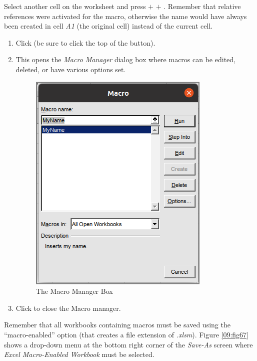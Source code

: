 Select another cell on the worksheet and press  $ + $  $ + $ . Remember that relative references were activated for the macro, otherwise the name would have always been created in cell \textit{A1} (the original cell) instead of the current cell.

\begin{enumbox}
	\begin{enumerate}
		\item Click  (be sure to click the top of the  button).
		\item This opens the \textit{Macro Manager} dialog box where macros can be edited, deleted, or have various options set.

		\begin{figure}[H]
			\centering
			\includegraphics[width=\maxwidth{.75\linewidth}]{gfx/ch09_fig66}
			\caption{The Macro Manager Box}
			\label{09:fig66}
		\end{figure}

		\item Click  to close the Macro manager.
	\end{enumerate}
\end{enumbox}

Remember that all workbooks containing macros must be saved using the ``macro-enabled'' option (that creates a file extension of \textit{.xlsm}). Figure \ref{09:fig67} shows a drop-down menu at the bottom right corner of the \textit{Save-As} screen where \textit{Excel Macro-Enabled Workbook} must be selected. 

